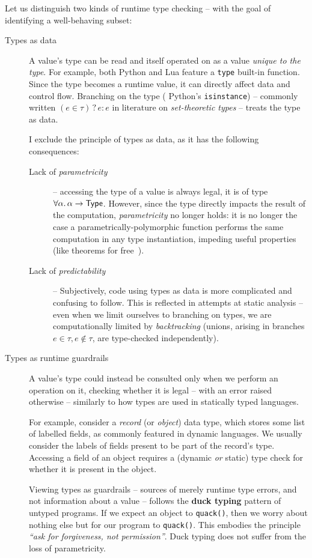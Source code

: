 Let us distinguish two kinds of runtime type checking -- with the goal of identifying a well-behaving subset: \begin{description}
    \item[Types as data] A value's type can be read and itself operated on as a value \emph{unique to the type}. For example, both Python and Lua feature a \texttt{type} built-in function. Since the type becomes a runtime value, it can directly affect data and control flow. 
    Branching on the type (\eg{} Python's \texttt{isinstance}) -- commonly written $(e \in \tau) \mathop{?} e \mathop{:} e$ in literature on \emph{set-theoretic types} \cite{castagna-dynamic} -- treats the type as data. 
    
    I exclude the principle of types as data, as it has the following consequences: \begin{description}
        \item[Lack of \emph{parametricity}] -- accessing the type of a value is always legal, \ie{} it is of type $\forall \alpha \ldotp \alpha \to \textsf{Type}$. However, since the type directly impacts the result of the computation, \emph{parametricity} no longer holds: it is no longer the case a parametrically-polymorphic function performs the same computation in any type instantiation, impeding useful properties (like theorems for free~\cite{theorems-for-free}).
        \item[Lack of \emph{predictability}] -- Subjectively, code using types as data is more complicated and confusing to follow. This is reflected in attempts at static analysis -- even when we limit ourselves to branching on types, we are computationally limited by \emph{backtracking} \cite{polymorphic-set-theoretic-types, castagna-dynamic, mlstruct} (unions, arising in branches $e \in \tau, e \notin \tau$, are type-checked independently).
    \end{description}
    \item[Types as runtime guardrails] A value's type could instead be consulted only when we perform an operation on it, checking whether it is legal -- with an error raised otherwise -- similarly to how types are used in statically typed languages.     
    
    For example, consider a \emph{record} (or \emph{object}) data type, which stores some list of labelled fields, as commonly featured in dynamic languages. 
    We usually consider the labels of fields present to be part of the record's type.
    Accessing a field of an object requires a (dynamic \emph{or} static) type check for whether it is present in the object.
    
    Viewing types as guardrails -- sources of merely runtime type errors, and not information about a value -- follows the \textbf{duck typing} pattern \cite{duck-typing} of untyped programs. If we expect an object to \texttt{quack()}, then we worry about nothing else but for our program to \texttt{quack()}. This embodies the principle \textit{\enquote{ask for forgiveness, not permission}}.
    Duck typing does not suffer from the loss of parametricity.
\end{description}
